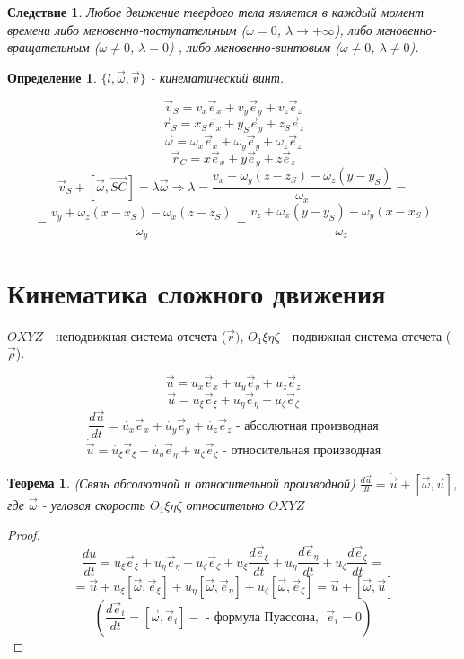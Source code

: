 \documentclass{article}
\renewcommand{\v}[1]{{\vec{#1}}}
\newtheorem*{df}{Определение}
\newtheorem{teo}{Теорема}
\newtheorem*{cor}{Следствие}
\begin{document}
  \begin{cor}
  Любое движение твердого тела является в каждый момент времени либо мгновенно-поступательным ($\omega = 0$, $\lambda \rightarrow +\infty$), либо мгновенно-вращательным ($\omega \neq 0$, $\lambda = 0$) , либо мгновенно-винтовым ($\omega \neq 0$, $\lambda \neq 0$).
  \end{cor}
  \begin{df}
  $\{l, \v{\omega}, \v{v}\}$ - кинематический винт.
  \end{df}
  $$\v{v}_S = v_x\v{e}_x + v_y\v{e}_y + v_z\v{e}_z$$
  $$\v{r}_S = x_S\v{e}_x + y_S\v{e}_y + z_S\v{e}_z$$
  $$\v{\omega} = \omega_x\v{e}_x + \omega_y\v{e}_y + \omega_z\v{e}_z$$
  $$ \v{r}_C = x\v{e}_x + y\v{e}_y + z\v{e}_z $$
  $$ \v{v}_S + [\v{\omega}, \v{SC}] = \lambda \v{\omega} \Rightarrow \lambda = \frac{v_x + \omega_y(z - z_S) - \omega_z(y - y_S)}{\omega_x} = $$
  $$ = \frac{v_y + \omega_z(x - x_S) - \omega_x(z - z_S)}{\omega_y} = \frac{v_z + \omega_x(y - y_S) - \omega_y(x - x_S)}{\omega_z} $$
  \section{Кинематика сложного движения}
  $OXYZ$ - неподвижная система отсчета ($\v{r})$, $O_1\xi\eta\zeta$ - подвижная система отсчета ($\v{\rho}$).

  $$ \v{u} = u_x \v{e}_x + u_y \v{e}_y + u_z \v{e}_z $$
  $$ \v{u} = u_{\xi} \v{e}_{\xi} + u_{\eta} \v{e}_{\eta} + u_{\zeta} \v{e}_{\zeta} $$
  $$ \frac{d\v{u}}{dt} = \dot {u_x} \v{e}_x + \dot{u_y} \v{e}_y + \dot{u_z} \v{e}_z \text{ - абсолютная производная} $$
  $$ \dot{\v u} = \dot{u_{\xi}} \v{e}_{\xi} + \dot{u_{\eta}} \v{e}_{\eta} + \dot{u_{\zeta}} \v{e}_{\zeta} \text{ - относительная производная}$$
  \begin{teo}(Связь абсолютной и относительной производной) 
  $\frac{d\v{u}}{dt} = \dot{\v{u}} + [\v{\omega}, \v{u}]$, где $\v{\omega}$ - угловая скорость $O_1\xi\eta\zeta$ относительно $OXYZ$
  \end{teo}
  \begin{proof}
  $$ \frac{du}{dt} = \dot{u}_{\xi}\vec{e}_{\xi} + \dot{u}_{\eta}\vec{e}_{\eta} + \dot{u}_{\zeta}\vec{e}_{\zeta} + u_{\xi}\frac{d\vec{e}_{\xi}}{dt} + u_{\eta}\frac{d\vec{e}_{\eta}}{dt} + u_{\zeta}\frac{d\vec{e}_{\zeta}}{dt} = $$
  $$ = \dot{\vec{u}} + u_{\xi}[\vec{\omega}, \vec{e}_{\xi}] + u_{\eta}[\vec{\omega}, \vec{e}_{\eta}] + u_{\zeta}[\vec{\omega}, \vec{e}_{\zeta}] = \dot{\vec{u}} + [\vec{\omega}, \vec{u}] $$
  $$ \left(\frac{d\vec{e}_i}{dt} = [\vec{\omega}, \vec{e}_i] - \text{ - формула Пуассона},~~ \dot{\vec{e}}_i = 0\right) $$
  \end{proof}
\end{document}
